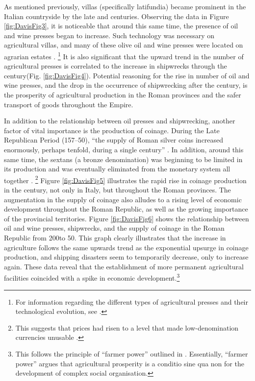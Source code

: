 
As mentioned previously, villas (specifically latifundia) became prominent in the Italian countryside by the late  and  centuries\BC. Observing the data in Figure \ref{fig:DavisFig3}, it is noticeable that around this same time, the presence of oil and wine presses began to increase. 
Such technology was necessary on agricultural villas, and many of these olive oil and wine presses were located on agrarian estates \parencites[74]{Frankel_1997}{Marzano_2013}.
\footnote{For information regarding the different types of agricultural presses and their technological evolution, see \textcite{Frankel_1997}.} It is also significant that the upward trend in the number of agricultural presses is correlated to the increase in shipwrecks through the  century\AD (Fig. \ref{fig:DavisFig4}). Potential reasoning for the rise in number of oil and wine presses, and the drop in the occurrence of shipwrecking after the  century\AD, is the prosperity of agricultural production in the Roman provinces and the safer transport of goods throughout the Empire.





In addition to the relationship between oil presses and shipwrecking, another factor of vital importance is the production of coinage. During the Late Republican Period (157--50\BC), “the supply of Roman silver coins increased enormously, perhaps tenfold, during a single century” \parencite[106]{Hopkins_1980}. In addition, around this same time, the sextans (a bronze denomination) was beginning to be limited in its production and was eventually eliminated from the monetary system all together \parencite[103]{Kay_2014}.
\footnote{This suggests that prices had risen to a level that made low-denomination currencies unusable \parencite[103]{Kay_2014}.}  Figure \ref{fig:DavisFig5} illustrates the rapid rise in coinage production in the  century\BC, not only in Italy, but throughout the Roman provinces. The augmentation in the supply of coinage also alludes to a rising level of economic development throughout the Roman Republic, as well as the growing importance of the provincial territories. Figure \ref{fig:DavisFig6} shows the relationship between oil and wine presses, shipwrecks, and the supply of coinage in the Roman Republic from 200\BC to 50\BC. This graph clearly illustrates that the increase in agriculture follows the same upwards trend as the exponential upsurge in coinage production, and shipping disasters seem to temporarily decrease, only to increase again. These data reveal that the establishment of more permanent agricultural facilities coincided with a spike in economic development.\footnote{This follows the principle of “farmer power” outlined in \textcite[81--88]{Diamond_1997}. Essentially, “farmer power” argues that agricultural prosperity is a conditio sine qua non for the development of complex social organisation.}

